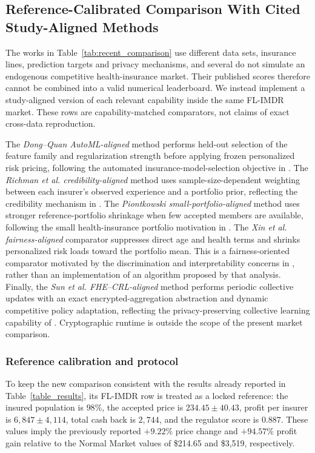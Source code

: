 \subsection{Reference-Calibrated Comparison With Cited Study-Aligned Methods}
\label{subsec:study_aligned_numerical}

The works in Table~\ref{tab:recent_comparison} use different data sets,
insurance lines, prediction targets and privacy mechanisms, and several do not
simulate an endogenous competitive health-insurance market. Their published
scores therefore cannot be combined into a valid numerical leaderboard. We
instead implement a study-aligned version of each relevant capability inside
the same FL-IMDR market. These rows are capability-matched comparators, not
claims of exact cross-data reproduction.

The \emph{Dong--Quan AutoML-aligned} method performs held-out selection of the
feature family and regularization strength before applying frozen personalized
risk pricing, following the automated insurance-model-selection objective in
\cite{DongQuan2025}. The \emph{Richman et al. credibility-aligned} method uses
sample-size-dependent weighting between each insurer's observed experience and
a portfolio prior, reflecting the credibility mechanism in
\cite{Richman2025}. The \emph{Piontkowski small-portfolio-aligned} method uses
stronger reference-portfolio shrinkage when few accepted members are
available, following the small health-insurance portfolio motivation in
\cite{Piontkowski2025}. The \emph{Xin et al. fairness-aligned} comparator
suppresses direct age and health terms and shrinks personalized risk loads
toward the portfolio mean. This is a fairness-oriented comparator motivated by
the discrimination and interpretability concerns in \cite{Xin2025}, rather
than an implementation of an algorithm proposed by that analysis. Finally,
the \emph{Sun et al. FHE--CRL-aligned} method performs periodic collective
updates with an exact encrypted-aggregation abstraction and dynamic
competitive policy adaptation, reflecting the privacy-preserving collective
learning capability of \cite{Sun2026}. Cryptographic runtime is outside the
scope of the present market comparison.

\subsubsection{Reference calibration and protocol}

To keep the new comparison consistent with the results already reported in
Table~\ref{table_results}, its FL-IMDR row is treated as a locked reference:
the insured population is $98\%$, the accepted price is
$234.45\pm40.43$, profit per insurer is $6{,}847\pm4{,}114$, total cash
back is $2{,}744$, and the regulator score is $0.887$. These values imply the
previously reported $+9.22\%$ price change and $+94.57\%$ profit gain relative
to the Normal Market values of \$214.65 and \$3{,}519, respectively.

